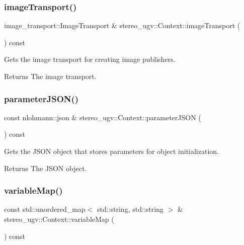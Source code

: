 \subsubsection{\texorpdfstring{image\+Transport()}{imageTransport()}}
{\footnotesize\ttfamily image\+\_\+transport\+::\+Image\+Transport \& stereo\+\_\+ugv\+::\+Context\+::image\+Transport (\begin{DoxyParamCaption}{ }\end{DoxyParamCaption}) const\hspace{0.3cm}{\ttfamily [noexcept]}}



Gets the image transport for creating image publishers. 

\begin{DoxyReturn}{Returns}
The image transport. 
\end{DoxyReturn}
\mbox{\label{classstereo__ugv_1_1Context_a6b40977abc9924a49282b26e05d866aa}} 
\subsubsection{\texorpdfstring{parameter\+J\+S\+O\+N()}{parameterJSON()}}
{\footnotesize\ttfamily const nlohmann\+::json \& stereo\+\_\+ugv\+::\+Context\+::parameter\+J\+S\+ON (\begin{DoxyParamCaption}{ }\end{DoxyParamCaption}) const\hspace{0.3cm}{\ttfamily [noexcept]}}



Gets the J\+S\+ON object that stores parameters for object initialization. 

\begin{DoxyReturn}{Returns}
The J\+S\+ON object. 
\end{DoxyReturn}
\mbox{\label{classstereo__ugv_1_1Context_a0071b4b8bc7f1b9a5c1ce541a68334e0}} 
\subsubsection{\texorpdfstring{variable\+Map()}{variableMap()}}
{\footnotesize\ttfamily const std\+::unordered\+\_\+map$<$ std\+::string, std\+::string $>$ \& stereo\+\_\+ugv\+::\+Context\+::variable\+Map (\begin{DoxyParamCaption}{ }\end{DoxyParamCaption}) const\hspace{0.3cm}{\ttfamily [noexcept]}}



